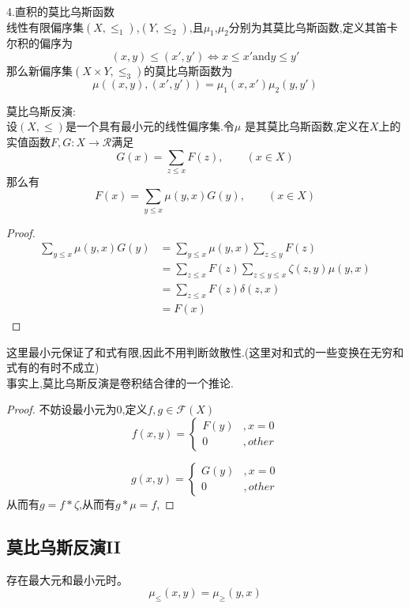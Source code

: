 4.直积的莫比乌斯函数\\
线性有限偏序集$(X,\le_1)$,$(Y,\le_2)$,且$\mu_1$,$\mu_2$分别为其莫比乌斯函数,定义其笛卡尔积的偏序为
$$
(x,y)\le (x',y') \iff x\le x' \text{and} y \le y'
$$
那么新偏序集$(X\times Y ,\le_3 )$的莫比乌斯函数为
$$
\mu((x,y),(x',y'))=\mu_1(x,x')\mu_2(y,y')
$$


\begin{theorem}
  莫比乌斯反演:\\
设$(X,\le)$是一个具有最小元的线性偏序集.令$\mu$ 是其莫比乌斯函数,定义在$X$上的实值函数$F,G:X\rightarrow \mathcal{R}$满足
$$
G(x)=\sum_{z\le x} F(z),\qquad (x\in X)
$$
那么有
$$
F(x)=\sum_{y\le x} \mu(y,x) G(y),\qquad (x\in X)
$$
\end{theorem}

\begin{proof}
  $$
  \begin{aligned}
  \sum_{y \le x} \mu(y,x) G(y) &=\sum_{y \le x} \mu(y,x) \sum_{z\le y} F(z)\\
  &=\sum_{z \le x}F(z) \sum_{ z\le y \le x} \zeta(z,y)\mu(y,x)\\
  &=\sum_{z\le x} F(z) \delta(z,x)\\
  &=F(x)
  \end{aligned}
  $$
\end{proof}
这里最小元保证了和式有限,因此不用判断敛散性.(这里对和式的一些变换在无穷和式有的有时不成立)\\ 
事实上,莫比乌斯反演是卷积结合律的一个推论.\\
\begin{proof}
  不妨设最小元为0,定义$f,g\in \mathcal{F}(X)$
  $$
  f(x,y)=\begin{cases}
  F(y)&, x=0\\
  0&,other
  \end{cases}
  $$

  $$
  g(x,y)=\begin{cases}
  G(y)&, x=0\\
  0&,other
  \end{cases}
  $$
  从而有$g=f*\zeta$,从而有$g*\mu=f$,

\end{proof}

\subsection{莫比乌斯反演II}
\begin{theorem}
  存在最大元和最小元时。
  $$
  \mu_{\le}(x,y)=\mu_{\ge} (y,x)
  $$
\end{theorem}
% 




